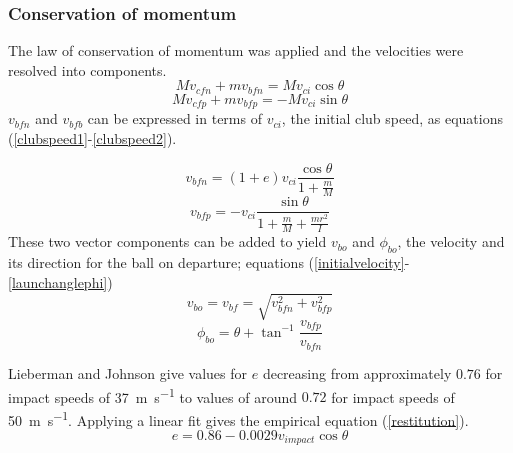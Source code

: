 \documentclass[12pt]{article}
\begin{document}
\subsubsection{Conservation of momentum}
The law of conservation of momentum was applied and the velocities were resolved into components.
\begin{equation} \label{linearmomentum1}
M v_{cfn}+mv_{bfn}=Mv_{ci} \cos{\theta}
\end{equation}
\begin{equation} \label{linearmomentum2}
M v_{cfp}+mv_{bfp}=-Mv_{ci} \sin{\theta}
\end{equation}
$v_{bfn}$ and $v_{bfb}$ can be expressed in terms of $v_{ci}$, the initial club speed, as equations (\ref{clubspeed1}-\ref{clubspeed2}).

\begin{equation} \label{clubspeed1}
v_{bfn}=(1+e)v_{ci} \frac{\cos{\theta}}{1+\frac{m}{M}}
\end{equation}
\begin{equation} \label{clubspeed2}
v_{bfp}=-v_{ci} \frac{\sin{\theta}}{1+\frac{m}{M}+\frac{mr^2}{I}}
\end{equation}
These two vector components can be added to yield $v_{bo}$ and $\phi_{bo}$, the velocity and its direction for the ball on departure; equations (\ref{initialvelocity}-\ref{launchanglephi})\cite{Penner2001}
\begin{equation} \label{initialvelocity}
v_{bo}=v_{bf}=\sqrt{v_{bfn}^2+v_{bfp}^2}
\end{equation}
\begin{equation} \label{launchanglephi}
\phi_{bo}=\theta+\tan^{-1}{\frac{v_{bfp}}{v_{bfn}}}
\end{equation}

Lieberman and Johnson give values for $e$ decreasing from approximately $0.76$ for impact speeds of \SI{37}{\metre\per\second} to values of around $0.72$ for impact speeds of \SI{50}{\metre\per\second}. Applying a linear fit gives the empirical equation (\ref{restitution})\cite{Penner2001}.
\begin{equation} \label{restitution}
e=0.86-0.0029 v_{impact} \cos{\theta}
\end{equation}
\end{document}
